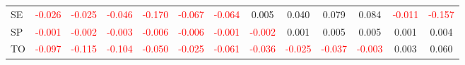 \documentclass[a4paper, 12pt]{article}
\begin{document}
\begin{table}[H]
{\begin{tabular}{lcccccccccccc}
      SE & \textcolor{red}{-0.026} & \textcolor{red}{-0.025} & \textcolor{red}{-0.046} & \textcolor{red}{-0.170} & \textcolor{red}{-0.067} & \textcolor{red}{-0.064} & 0.005 & 0.040 & 0.079 & 0.084 & \textcolor{red}{-0.011} & \textcolor{red}{-0.157}\\
      SP & \textcolor{red}{-0.001} & \textcolor{red}{-0.002} & \textcolor{red}{-0.003} & \textcolor{red}{-0.006} & \textcolor{red}{-0.006} & \textcolor{red}{-0.001} & \textcolor{red}{-0.002} & 0.001 & 0.005 & 0.005 & 0.001 & 0.004\\
      TO & \textcolor{red}{-0.097} & \textcolor{red}{-0.115} & \textcolor{red}{-0.104} & \textcolor{red}{-0.050} & \textcolor{red}{-0.025} & \textcolor{red}{-0.061} & \textcolor{red}{-0.036} & \textcolor{red}{-0.025} & \textcolor{red}{-0.037} & \textcolor{red}{-0.003} & 0.003 & 0.060\\
      \hline
    \end{tabular}%
  }
  \label{tab:dem_var_sh}
\end{table}
\end{document}

